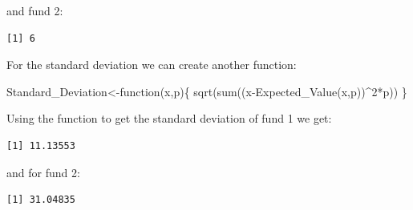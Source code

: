 \documentclass[
  letterpaper,
  DIV=11,
  numbers=noendperiod]{scrreprt}
\newenvironment{Shaded}{\begin{snugshade}}{\end{snugshade}}
\newcommand{\ControlFlowTok}[1]{\textcolor[rgb]{0.00,0.23,0.31}{#1}}
\newcommand{\DecValTok}[1]{\textcolor[rgb]{0.68,0.00,0.00}{#1}}
\newcommand{\FunctionTok}[1]{\textcolor[rgb]{0.28,0.35,0.67}{#1}}
\newcommand{\NormalTok}[1]{\textcolor[rgb]{0.00,0.23,0.31}{#1}}
\newcommand{\OtherTok}[1]{\textcolor[rgb]{0.00,0.23,0.31}{#1}}
\newcommand{\SpecialCharTok}[1]{\textcolor[rgb]{0.37,0.37,0.37}{#1}}
\begin{document}
and fund 2:

\begin{Shaded}
\end{Shaded}

\begin{verbatim}
[1] 6
\end{verbatim}

For the standard deviation we can create another function:

\begin{Shaded}
\begin{Highlighting}[numbers=left,,]
\NormalTok{Standard\_Deviation}\OtherTok{\textless{}{-}}\ControlFlowTok{function}\NormalTok{(x,p)\{}
  \FunctionTok{sqrt}\NormalTok{(}\FunctionTok{sum}\NormalTok{((x}\SpecialCharTok{{-}}\FunctionTok{Expected\_Value}\NormalTok{(x,p))}\SpecialCharTok{\^{}}\DecValTok{2}\SpecialCharTok{*}\NormalTok{p))}
\NormalTok{\}}
\end{Highlighting}
\end{Shaded}

Using the function to get the standard deviation of fund 1 we get:

\begin{Shaded}
\end{Shaded}

\begin{verbatim}
[1] 11.13553
\end{verbatim}

and for fund 2:

\begin{Shaded}
\end{Shaded}

\begin{verbatim}
[1] 31.04835
\end{verbatim}
\end{document}
